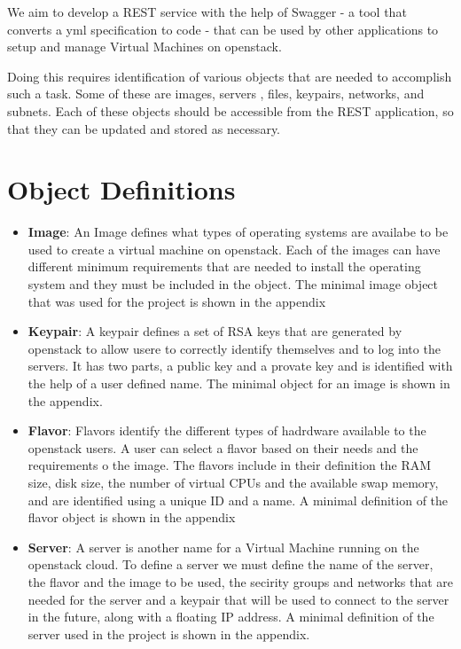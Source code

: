 We aim to develop a REST service with the help of Swagger - a tool
that converts a yml specification to code - that can be used by other
applications to setup and manage Virtual Machines on openstack.

Doing this requires identification of various objects that are needed
to accomplish such a task. Some of these are images, servers , files,
keypairs, networks, and subnets. Each of these objects should be
accessible from the REST application, so that they can be updated and
stored as necessary.

\section{Object Definitions}

\begin{itemize}

\item \textbf{Image}: An Image defines what types of operating systems are
availabe to be used to create a virtual machine on openstack. Each of the
images can have different minimum requirements that are needed to install
the operating system and they must be included in the object. The minimal
image object that was used for the project is shown in the appendix

\item \textbf{Keypair}: A keypair defines a set of RSA keys that are
generated by openstack to allow usere to correctly identify themselves
and to log into the servers. It has two parts, a public key and a provate
key and is identified with the help of a user defined name. The minimal
object for an image is shown in the appendix.

\item \textbf{Flavor}: Flavors identify the different types of hadrdware
available to the openstack users. A user can select a flavor based on their
needs and the requirements o the image. The flavors include in their
definition the RAM size, disk size, the number of virtual CPUs and the
available swap memory, and are identified using a unique ID and a name.
A minimal definition of the flavor object is shown in the appendix

\item \textbf{Server}: A server is another name for a Virtual Machine
running on the openstack cloud. To define a server we must define the name
of the server, the flavor and the image to be used, the secirity groups
and networks that are needed for the server and a keypair that will be
used to connect to the server in the future, along with a floating IP
address. A minimal definition of the server used in the project is shown
in the appendix.


\end{itemize}
